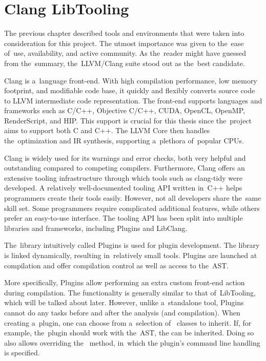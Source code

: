 \chapter{Clang LibTooling}

The previous chapter described tools and environments that were taken
into consideration for this project. 
The utmost importance was given to the~ease of~use, availability, and 
active community. 
As the~reader might have guessed from the~summary, the~LLVM/Clang 
suite stood out as the~best candidate.

Clang is a~language front-end. With high compilation performance, 
low memory footprint, and modifiable code base, it quickly and flexibly 
converts source code to LLVM intermediate code representation. 
The front-end supports languages and frameworks such as C/C++, 
Objective C/C++, CUDA, OpenCL, OpenMP, RenderScript, and HIP. 
This support is crucial for this thesis since the~project 
aims to support both C and C++. 
The LLVM Core then handles the~optimization and IR synthesis, 
supporting a~plethora of~popular CPUs.

Clang is widely used for its warnings and error checks, both very 
helpful and outstanding compared to competing compilers. 
Furthermore, Clang offers an extensive tooling infrastructure 
through which tools such as clang-tidy were developed. 
A relatively well-documented tooling API written in~C++ helps 
programmers create their tools easily. 
However, not all developers share the~same skill set. 
Some programmers require complicated additional features, while others 
prefer an easy-to-use interface. 
The tooling API has been split into multiple libraries and frameworks,
including Plugins and LibClang.

The~library intuitively called Plugins is used for plugin development.
The library is linked dynamically, resulting in~relatively small tools.
Plugins are launched at compilation and offer compilation control as well 
as access to the~AST.

More specifically, Plugins allow performing an extra custom front-end action 
during compilation.
The functionality is generally similar to that of~LibTooling, which will be 
talked about later.
However, unlike a~standalone tool, Plugins cannot do any tasks before and after 
the analysis (and compilation).
When creating a~plugin, one can choose from a~selection of~
 classes to inherit.
If, for example, the~plugin should work with the~AST, 
the  can be inherited.
Doing so also allows overriding the~ method, in~which 
the plugin's command line handling is specified.

